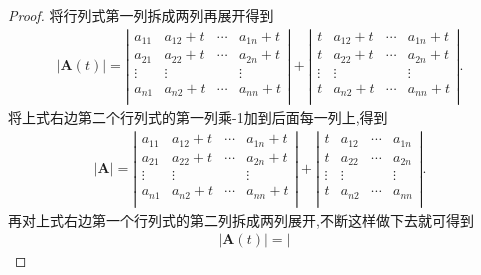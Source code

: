 \documentclass[lang=cn,newtx,10pt,scheme=chinese]{elegantbook}
\begin{document}
\begin{proof}
    将行列式第一列拆成两列再展开得到
    \begin{align*}
        |\boldsymbol{A}(t)|=\left| \begin{matrix}
            a_{11}&		a_{12}+t&		\cdots&		a_{1n}+t\\
            a_{21}&		a_{22}+t&		\cdots&		a_{2n}+t\\
            \vdots&		\vdots&		&		\vdots\\
            a_{n1}&		a_{n2}+t&		\cdots&		a_{nn}+t\\
        \end{matrix} \right|+\left| \begin{matrix}
            t&		a_{12}+t&		\cdots&		a_{1n}+t\\
            t&		a_{22}+t&		\cdots&		a_{2n}+t\\
            \vdots&		\vdots&		&		\vdots\\
            t&		a_{n2}+t&		\cdots&		a_{nn}+t\\
        \end{matrix} \right|.
        \nonumber
    \end{align*}
    将上式右边第二个行列式的第一列乘-1加到后面每一列上,得到
    \begin{align*}
        \left| \boldsymbol{A} \right|=\left| \begin{matrix}
            a_{11}&		a_{12}+t&		\cdots&		a_{1n}+t\\
            a_{21}&		a_{22}+t&		\cdots&		a_{2n}+t\\
            \vdots&		\vdots&		&		\vdots\\
            a_{n1}&		a_{n2}+t&		\cdots&		a_{nn}+t\\
        \end{matrix} \right|+\left| \begin{matrix}
            t&		a_{12}&		\cdots&		a_{1n}\\
            t&		a_{22}&		\cdots&		a_{2n}\\
            \vdots&		\vdots&		&		\vdots\\
            t&		a_{n2}&		\cdots&		a_{nn}\\
        \end{matrix} \right| .
        \nonumber
    \end{align*}
再对上式右边第一个行列式的第二列拆成两列展开,不断这样做下去就可得到
\begin{gather*}
    |\boldsymbol{A}(t)|=\left| \begin{matrix}

\end{matrix}
\end{gather*}
\end{proof}
\end{document}
